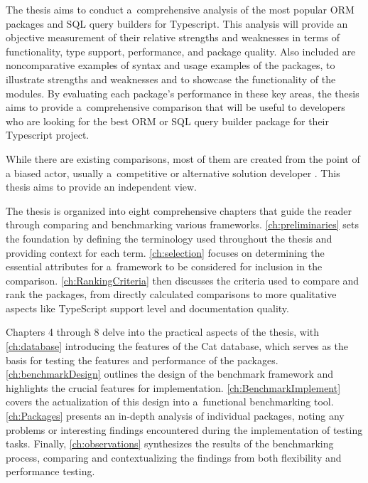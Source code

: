 The thesis aims to conduct a~comprehensive analysis of the most popular ORM
packages and SQL query builders for Typescript. This analysis will provide an
objective measurement of their relative strengths and weaknesses in terms of
functionality, type support, performance, and package quality. Also included are
noncomparative examples of syntax and usage examples of the packages, to
illustrate strengths and weaknesses and to showcase the functionality of the
modules. By evaluating each package's performance in these key areas, the thesis
aims to provide a~comprehensive comparison that will be useful to developers who
are looking for the best ORM or SQL query builder package for their Typescript
project.

While there are existing comparisons, most of them are created from the point of
a biased actor, usually a~competitive or alternative solution developer
\cite{drizzleComparison} \cite{imdbBench}. This thesis aims to provide an
independent view.


The thesis is organized into eight comprehensive chapters that guide the reader
through comparing and benchmarking various frameworks.
\autoref{ch:preliminaries} sets the foundation by defining the terminology used
throughout the thesis and providing context for each term.
\autoref{ch:selection} focuses on determining the essential attributes for
a~framework to be considered for inclusion in the comparison.
\autoref{ch:RankingCriteria} then discusses the criteria used to compare and
rank the packages, from directly calculated comparisons to more qualitative
aspects like TypeScript support level and documentation quality. 

Chapters 4 through 8 delve into the practical aspects of the thesis, with
\autoref{ch:database} introducing the features of the Cat database, which serves
as the basis for testing the features and performance of the packages.
\autoref{ch:benchmarkDesign} outlines the design of the benchmark framework and
highlights the crucial features for implementation.
\autoref{ch:BenchmarkImplement} covers the actualization of this design into
a~functional benchmarking tool. \autoref{ch:Packages} presents an in-depth
analysis of individual packages, noting any problems or interesting findings
encountered during the implementation of testing tasks. Finally,
\autoref{ch:observations} synthesizes the results of the benchmarking process,
comparing and contextualizing the findings from both flexibility and performance
testing.